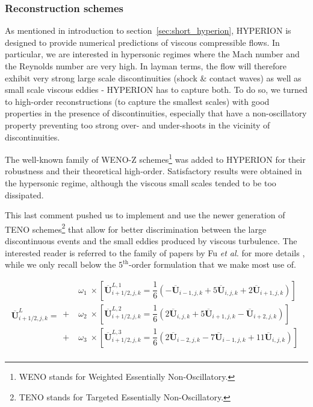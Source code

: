 \subsubsection{Reconstruction schemes}\label{sssec:interpolations}

As mentioned in introduction to section~\ref{sec:short_hyperion}, HYPERION is designed to provide numerical predictions of viscous compressible flows.
In particular, we are interested in hypersonic regimes where the Mach number and the Reynolds number are very high.
In layman terms, the flow will therefore exhibit very strong large scale discontinuities (shock \& contact waves) as well as small scale viscous eddies - HYPERION has to capture both.
To do so, we turned to high-order reconstructions (to capture the smallest scales) with good properties in the presence of discontinuities, especially that have a non-oscillatory property preventing too strong over- and under-shoots in the vicinity of discontinuities.

The well-known family of WENO-Z schemes\footnote{WENO stands for Weighted Essentially Non-Oscillatory.} was added to HYPERION \cite{liu1994weighted,jiang1996efficient,hu2010adaptive,henrick2005mapped} for their robustness and their theoretical high-order.
Satisfactory results were obtained in the hypersonic regime, although the viscous small scales tended to be too dissipated.

This last comment pushed us to implement and use the newer generation of TENO \cite{fu2016family,hu2011scale} schemes\footnote{TENO stands for Targeted Essentially Non-Oscillatory.} that allow for better discrimination between the large discontinuous events and the small eddies produced by viscous turbulence.
The interested reader is referred to the family of papers by Fu \emph{et al.} for more details \cite{fu2016family,fu2017targeted,fu2018new,fu2019low,fu2019very}, while we only recall below the $5^{\text{th}}$-order formulation that we make most use of.

\begin{equation}
    \overline{\mathbf{U}}^L_{i+1/2,j,k} =
    \begin{aligned}
          & \; \omega_1\; \times \left[ \overline{\mathbf{U}}_{i+1/2,j,k}^{L,1} = \dfrac{1}{6} \left({-\overline{\mathbf{U}}}_{i-1,j,k} + 5{\overline{\mathbf{U}}}_{i,j,k} + 2{\overline{\mathbf{U}}}_{i+1,j,k} \right) \right]\\
        + & \; \omega_2\; \times \left[ \overline{\mathbf{U}}_{i+1/2,j,k}^{L,2} = \dfrac{1}{6} \left({2\overline{\mathbf{U}}}_{i,j,k} + 5 {\overline{\mathbf{U}}}_{i+1,j,k} - {\overline{\mathbf{U}}}_{i+2,j,k} \right) \right]\\
        + & \; \omega_3\; \times \left[ \overline{\mathbf{U}}_{i+1/2,j,k}^{L,3} = \dfrac{1}{6} \left({2\overline{\mathbf{U}}}_{i-2,j,k} - 7{\overline{\mathbf{U}}}_{i-1,j,k} + 11{\overline{\mathbf{U}}}_{i,j,k} \right) \right]\\
    \end{aligned}
    \label{eq:teno5}
\end{equation}

